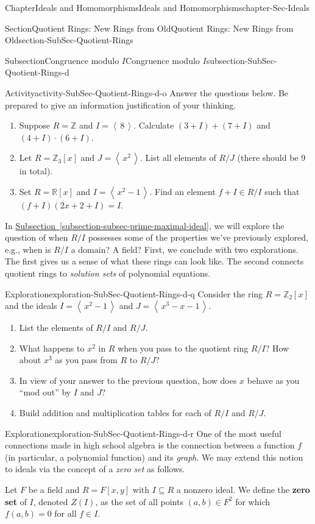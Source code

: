 \documentclass[oneside,10pt,]{book}
\newcommand{\xreffont}{\relax}
\newcommand{\terminology}[1]{\textbf{#1}}
\numberwithin{equation}{section}
\newcommand{\ideal}[1]{\left\langle\, #1 \,\right\rangle}
\def\Z{{\mathbb Z}}
\def\R{{\mathbb R}}
\begin{document}
\begin{chapterptx}{Chapter}{Ideals and Homomorphisms}{}{Ideals and Homomorphisms}{}{}{chapter-Sec-Ideals}
\begin{sectionptx}{Section}{Quotient Rings: New Rings from Old}{}{Quotient Rings: New Rings from Old}{}{}{section-SubSec-Quotient-Rings}
\begin{subsectionptx}{Subsection}{Congruence modulo \(I\)}{}{Congruence modulo \(I\)}{}{}{subsection-SubSec-Quotient-Rings-d}
\begin{activity}{Activity}{}{activity-SubSec-Quotient-Rings-d-o}
Answer the questions below. Be prepared to give an information justification of your thinking.%
%
\begin{enumerate}
\item{}Suppose \(R= \Z\) and \(I = \ideal{8}\). Calculate \((3+I) + (7+I)\) and \((4+I)\cdot (6+I)\).%
\item{}Let \(R = \Z_3[x]\) and \(J = \ideal{x^2}\). List all elements of \(R/J\) (there should be 9 in total).%
\item{}Set \(R = \R[x]\) and \(I = \ideal{x^2-1}\). Find an element \(f + I \in R/I\) such that \((f+I)(2x+2 + I) = I\).%
\end{enumerate}
\end{activity}%
In \hyperref[subsection-subsec-prime-maximal-ideal]{Subsection~{\xreffont\ref{subsection-subsec-prime-maximal-ideal}}}, we will explore the question of when \(R/I\) possesses some of the properties we've previously explored, e.g., when is \(R/I\) a domain? A field? First, we conclude with two explorations. The first gives us a sense of what these rings can look like. The second connects quotient rings to \emph{solution sets} of polynomial equations.%
\begin{exploration}{Exploration}{}{exploration-SubSec-Quotient-Rings-d-q}%
Consider the ring \(R=\Z_2[x]\) and the ideals \(I = \ideal{x^2-1}\) and \(J = \ideal{x^3 -x -1}\).%
%
\begin{enumerate}
\item{}List the elements of \(R/I\) and \(R/J\).%
\item{}What happens to \(x^2\) in \(R\) when you pass to the quotient ring \(R/I\)? How about \(x^3\) as you pass from \(R\) to \(R/J\)?%
\item{}In view of your answer to the previous question, how does \(x\) behave as you ``mod out'' by \(I\) and \(J\)?%
\item{}Build addition and multiplication tables for each of \(R/I\) and \(R/J\).%
\end{enumerate}
\end{exploration}%
\begin{exploration}{Exploration}{}{exploration-SubSec-Quotient-Rings-d-r}%
%
%
One of the most useful connections made in high school algebra is the connection between a function \(f\) (in particular, a polynomial function) and its \emph{graph}. We may extend this notion to ideals via the concept of a \emph{zero set} as follows.%
\par
Let \(F\) be a field and \(R = F[x,y]\) with \(I\subseteq R\) a nonzero ideal. We define the \terminology{zero set} of \(I\), denoted \(Z(I)\), as the set of all points \((a,b)\in F^2\) for which \(f(a,b)=0\) for all \(f\in I\).%

\end{exploration}
\end{subsectionptx}
\end{sectionptx}
\end{chapterptx}
\end{document}
